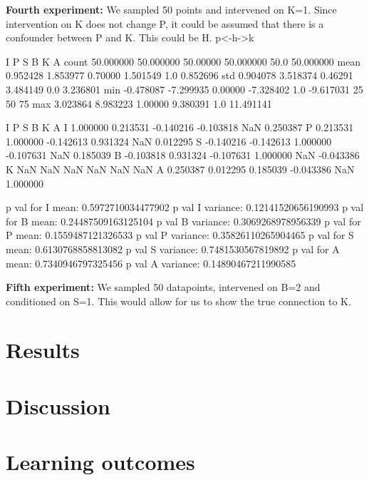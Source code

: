 \documentclass[12pt,fleqn,]{article}
\begin{document}
\begin{multicols}{2}
\textbf{Fourth experiment:} We sampled 50 points and intervened on K=1. Since intervention on K does not change P, it could be assumed that there is a confounder between P and K. This could be H.
p<-h->k


           I          P         S          B     K          A
count  50.000000  50.000000  50.00000  50.000000  50.0  50.000000
mean    0.952428   1.853977   0.70000   1.501549   1.0   0.852696
std     0.904078   3.518374   0.46291   3.484149   0.0   3.236801
min    -0.478087  -7.299935   0.00000  -7.328402   1.0  -9.617031
25%
50%
75%
max     3.023864   8.983223   1.00000   9.380391   1.0  11.491141

      I         P         S         B   K         A
I  1.000000  0.213531 -0.140216 -0.103818 NaN  0.250387
P  0.213531  1.000000 -0.142613  0.931324 NaN  0.012295
S -0.140216 -0.142613  1.000000 -0.107631 NaN  0.185039
B -0.103818  0.931324 -0.107631  1.000000 NaN -0.043386
K       NaN       NaN       NaN       NaN NaN       NaN
A  0.250387  0.012295  0.185039 -0.043386 NaN  1.000000

p val for I mean: 0.5972710034477902
p val I variance: 0.12141520656190993
p val for B mean: 0.24487509163125104
p val B variance: 0.3069268978956339
p val for P mean: 0.1559487121326533
p val P variance: 0.35826110265904465
p val for S mean: 0.6130768858813082
p val S variance: 0.7481530567819892
p val for A mean: 0.7340946797325456
p val A variance: 0.14890467211990585

\textbf{Fifth experiment:} We sampled 50 datapoints, intervened on B=2 and conditioned on S=1. This would allow for us to show the true connection to K.

\end{multicols}		

\section{Results}



\begin{multicols}{2}
	
	\section{Discussion}
	

	
	\section{Learning outcomes} 
	
\end{multicols}

\newpage
\begin{thebibliography}{9}
	

	
	
	

\end{thebibliography}
\end{document}

